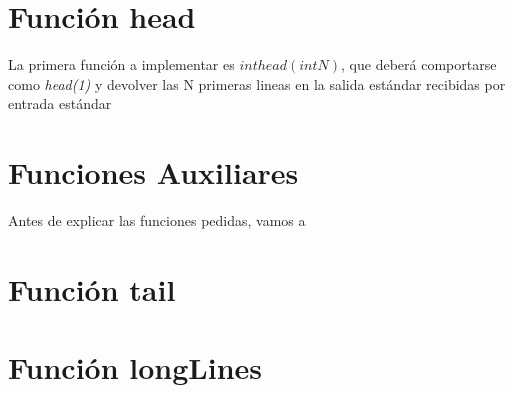 \chapter*{Función head}
La primera función a implementar es $int head(int N)$, que deberá comportarse como \textit{head(1)} y devolver las N primeras lineas en la salida estándar recibidas por entrada estándar

\chapter*{Funciones Auxiliares}
Antes de explicar las funciones pedidas, vamos a 
\chapter*{Función tail}


\chapter*{Función longLines}
